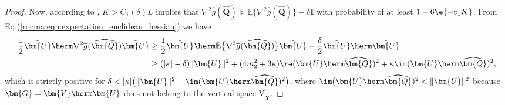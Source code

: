 \begin{proof}
	Now, according to \cite[Lemma~1]{Feres2019wfcma}, $K>C_1(\delta)L$ implies that $\nabla^2 \overline{\overline{g}}(\widehat{\bm{Q}})\succeq\mathbb{E}\{\nabla^2 \overline{\overline{g}}(\widehat{\bm{Q}})\}-\delta\bm{I}$ with probability of at least $1-6\e{-c_1K}$. 
	From Eq.(\ref{rocma:eqn:expectation_euclidean_hessian})
	we have
	\begin{align}
		\frac{1}{2}
		\tilde{\bm{U}}
		\herm
		\nabla^2 \overline{\overline{g}}(\widehat{\bm{Q}})
		\tilde{\bm{U}}
		&\geq \frac{1}{2}
		\tilde{\bm{U}}
		\herm
		\mathbb{E}\big\{\nabla^2 \overline{\overline{g}}(\widehat{\bm{Q}})\big\}
		\tilde{\bm{U}}
		-\frac{\delta}{2}
		\tilde{\bm{U}}
		\herm
		\tilde{\bm{U}}
		\nonumber\\&
		\geq (|\kappa|-\delta)\|\bm{U}\|^2 +(4m_2^2+3\kappa)\re(\bm{U}\herm\widehat{\bm{Q}})^2
		+\kappa\im(\bm{U}\herm\widehat{\bm{Q}})^2,\nonumber
	\end{align}
	which is strictly positive for $\delta<|\kappa|\big(\|\bm{U}\|^2-\im(\bm{U}\herm\widehat{\bm{Q}})^2\big)$, where $\im(\bm{U}\herm\widehat{\bm{Q}})^2<\|\bm{U}\|^2$ because $\bm{G}=\bm{V}\herm\bm{U}$ does not belong to the vertical space $\mathrm{V}_{\widehat{\bm{Y}}}$.
	
	

\end{proof}
